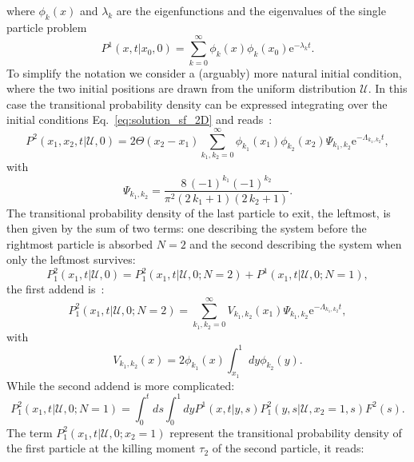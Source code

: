\documentclass[a4paper,11pt]{amsart}
\theoremstyle{remark}
\newcommand{\ee}[1]{\mathrm{e}^{#1}}
\begin{document}
where $\phi_k(x)$ and $\lambda_k$ are the eigenfunctions and the eigenvalues of the single particle problem
\begin{equation}
  \label{eq:single_sol}
  P^1(x,t|x_0,0)=\sum_{k=0}^\infty \phi_k(x)\phi_k(x_0)\ee{-\lambda_k t}.
\end{equation}
To simplify the notation we consider a (arguably) more natural initial condition, where the two initial positions are drawn from the uniform distribution $\mathcal{U}$. In this case the transitional probability density can be expressed integrating over the initial conditions Eq.~\eqref{eq:solution_sf_2D} and reads~\cite{lapolla_first_2022}:
\begin{equation}
  \label{eq:single_equilibrium_2D}
   P^2(x_1,x_2,t|\mathcal{U},0)=2\Theta(x_2-x_1)\sum_{k_1,k_2=0}^\infty\phi_{k_1}(x_1)\phi_{k_2}(x_2)\Psi_{k_1,k_2}\ee{-\Lambda_{k_1,k_2}t},
 \end{equation}
 with
 \begin{equation*}
  \Psi_{k_1,k_2}=\frac{8 \, \left(-1\right)^{k_{1}} \left(-1\right)^{k_{2}}}{\pi^{2} {\left(2 \, k_{1} + 1\right)} {\left(2 \, k_{2} + 1\right)}}.
 \end{equation*}
 The transitional probability density of the last particle to exit, the leftmost, is then given by the sum of two terms: one describing the system before the rightmost particle is absorbed $N=2$ and the second describing the system when only the leftmost survives:
 \begin{equation}
   \label{eq:greensf_decomposition}
   P^2_1(x_1,t|\mathcal{U},0)=P^2_1(x_1,t|\mathcal{U},0; N=2)+P^1(x_1,t|\mathcal{U},0; N=1),
 \end{equation}
 the first addend is~\cite{lapolla_bethesf_2020}:
 \begin{equation}
   \label{eq:greensf_N2}
   P^2_1(x_1,t|\mathcal{U},0; N=2)=\sum_{k_1,k_2=0}^\infty V_{k_1,k_2}(x_1)\Psi_{k_1,k_2}\ee{-\Lambda_{k_1,k_2}t},
 \end{equation}
 with~\cite{lapolla_bethesf_2020}
 \begin{equation*}
   V_{k_1,k_2}(x)=2\phi_{k_1}(x)\int_{x_1}^1 dy \phi_{k_2}(y).
 \end{equation*}
 While the second addend is more complicated:
 \begin{equation}
   \label{eq:greensf_N1}
   P^2_1(x_1,t|\mathcal{U},0; N=1)=\int_0^t ds\int_0^1 dy P^1(x,t|y,s)P^2_1(y,s|\mathcal{U},x_2=1,s)F^2(s).
 \end{equation}
 The term $P_1^2(x_1,t|\mathcal{U},0;x_2=1)$ represent the transitional probability density of the first particle at the killing moment $\tau_2$ of the second particle, it reads:
\end{document}
